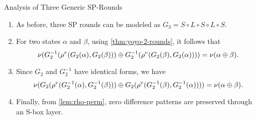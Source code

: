 \documentclass[notheorems]{beamer}
\theoremstyle{definition}
\theoremstyle{example}
\begin{document}
    \begin{frame}{Analysis of Three Generic SP-Rounds}
        \begin{enumerate}
            \item<1-> As before, three SP rounds can be modeled as \(G_3 = S
            \circ L \circ S \circ L \circ S\). 
            \item<2-> For two states \(\alpha\) and \(\beta\), using
            \cref{thm:yoyo-2-rounds}, it follows that
            \begin{equation}
                \nu(G_2^{-1}(\rho^v(G_2(\alpha), G_2(\beta))) \oplus G_2^{-1}(\rho^v(G_2(\beta), G_2(\alpha)))) = \nu(\alpha \oplus \beta).
            \end{equation}
            \item<3-> Since \(G_2\) and \(G_2^{-1}\) have identical forms, we
            have
            \begin{equation}
                \nu(G_2(\rho^v(G_2^{-1}(\alpha), G_2^{-1}(\beta))) \oplus G_2(\rho^v(G_2^{-1}(\beta), G_2^{-1}(\alpha)))) = \nu(\alpha \oplus \beta).
            \end{equation}
            \item<4-> Finally, from \cref{lem:rho-perm}, zero difference
            patterns are preserved through an S-box layer.
        \end{enumerate}
    \end{frame}
\end{document}
